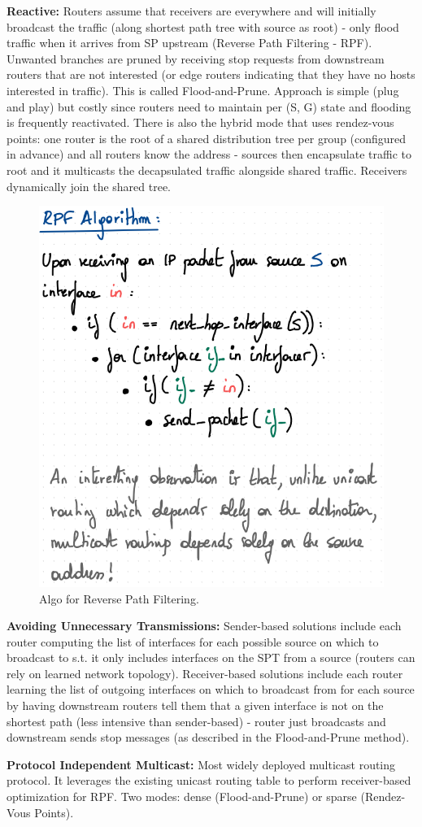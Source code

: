 \textbf{Reactive:} Routers assume that receivers are everywhere and will initially broadcast the traffic (along shortest path tree with source as root) - only flood traffic when it arrives from SP upstream (Reverse Path Filtering - RPF). Unwanted branches are pruned by receiving stop requests from downstream routers that are not interested (or edge routers indicating that they have no hosts interested in traffic). This is called Flood-and-Prune. Approach is simple (plug and play) but costly since routers need to maintain per (S, G) state and flooding is frequently reactivated. There is also the hybrid mode that uses rendez-vous points: one router is the root of a shared distribution tree per group (configured in advance) and all routers know the address  - sources then encapsulate traffic to root and it multicasts the decapsulated traffic alongside shared traffic. Receivers dynamically join the shared tree.

\begin{figure}[h]
	\centering
	\includegraphics[scale=0.6]{images/5-rpf.PNG}
	\caption{Algo for Reverse Path Filtering.}
	\label{fig:rpf}
\end{figure}

\textbf{Avoiding Unnecessary Transmissions:} Sender-based solutions include each router computing the list of interfaces for each possible source on which to broadcast to s.t. it only includes interfaces on the SPT from a source (routers can rely on learned network topology). Receiver-based solutions include each router learning the list of outgoing interfaces on which to broadcast from for each source by having downstream routers tell them that a given interface is not on the shortest path (less intensive than sender-based) - router just broadcasts and downstream sends stop messages (as described in the Flood-and-Prune method).


\textbf{Protocol Independent Multicast:} Most widely deployed multicast routing protocol. It leverages the existing unicast routing table to perform receiver-based optimization for RPF. Two modes: dense (Flood-and-Prune) or sparse (Rendez-Vous Points).

